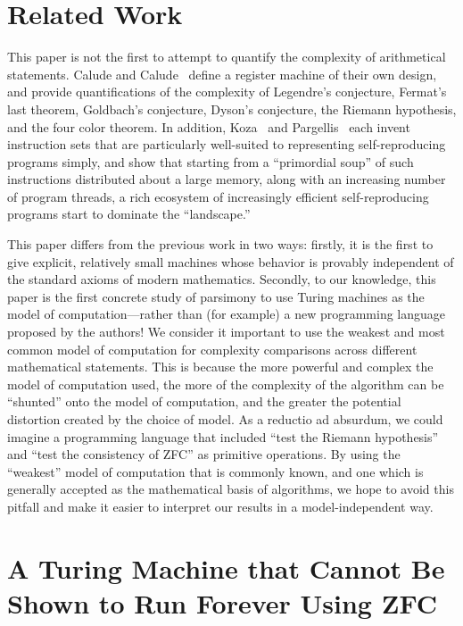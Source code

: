 \documentclass[11pt]{article}
\begin{document}
\section{Related Work}

This paper is not the first to attempt to quantify the complexity of arithmetical statements. Calude and Calude~\cite{calude} define a register machine of their own design, and provide quantifications of the complexity of Legendre's conjecture, Fermat's last theorem, Goldbach's conjecture, Dyson's conjecture, the Riemann hypothesis, and the four color theorem.\footnotemark
{}
In addition, Koza~\cite{koza} and Pargellis~\cite{pargellis} each invent instruction sets that are particularly well-suited to representing self-reproducing programs simply, and show that starting from a ``primordial soup'' of such instructions distributed about a large memory, along with an increasing number of program threads, a rich ecosystem of increasingly efficient self-reproducing programs start to dominate the ``landscape.'' 

This paper differs from the previous work in two ways: firstly, it is the first to give explicit, relatively small machines whose behavior is provably independent of the standard axioms of modern mathematics. Secondly, to our knowledge, this paper is the first concrete study of parsimony to use Turing machines as the model of computation---rather than (for example) a new programming language proposed by the authors! We consider it important to use the weakest and most common model of computation for complexity comparisons across different mathematical statements. This is because the more powerful and complex the model of computation used, the more of the complexity of the algorithm can be ``shunted'' onto the model of computation, and the greater the potential distortion created by the choice of model. As a reductio ad absurdum, we could imagine a programming language that included ``test the Riemann hypothesis'' and ``test the consistency of ZFC'' as primitive operations. By using the ``weakest'' model of computation that is commonly known, and one which is generally accepted as the mathematical basis of algorithms, we hope to avoid this pitfall and make it easier to interpret our results in a model-independent way.



\section{A Turing Machine that Cannot Be Shown to Run Forever Using ZFC}
\end{document}
